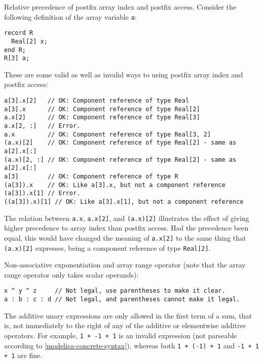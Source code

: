\begin{example}
Relative precedence of postfix array index and postfix access.
Consider the following definition of the array variable \lstinline!a!:
\begin{lstlisting}[language=modelica]
record R
  Real[2] x;
end R;
R[3] a;
\end{lstlisting}
These are some valid as well as invalid ways to using postfix array index and postfix access:
\begin{lstlisting}[language=modelica]
a[3].x[2]   // OK: Component reference of type Real
a[3].x      // OK: Component reference of type Real[2]
a.x[2]      // OK: Component reference of type Real[3]
a.x[2, :]   // Error.
a.x         // OK: Component reference of type Real[3, 2]
(a.x)[2]    // OK: Component reference of type Real[2] - same as a[2].x[:]
(a.x)[2, :] // OK: Component reference of type Real[2] - same as a[2].x[:]
a[3]        // OK: Component reference of type R
(a[3]).x    // OK: Like a[3].x, but not a component reference
(a[3]).x[1] // Error.
((a[3]).x)[1] // OK: Like a[3].x[1], but not a component reference
\end{lstlisting}
The relation between \lstinline!a.x!, \lstinline!a.x[2]!, and \lstinline!(a.x)[2]! illustrates the effect of giving higher precedence to array index than postfix access.
Had the precedence been equal, this would have changed the meaning of \lstinline!a.x[2]! to the same thing that \lstinline!(a.x)[2]! expresses, being a component reference of type \lstinline!Real[2]!.
\end{example}

\begin{example}
Non-associative exponentiation and array range operator (note that the array range operator only takes scalar operands):
\begin{lstlisting}[language=modelica]
x ^ y ^ z     // Not legal, use parentheses to make it clear.
a : b : c : d // Not legal, and parentheses cannot make it legal.
\end{lstlisting}
\end{example}

The additive unary expressions are only allowed in the first term of a sum, that is, not immediately to the right of any of the additive or elementwise additive operators.
For example, \lstinline!1 + -1 + 1! is an invalid expression (not parseable according to \cref{modelica-concrete-syntax}), whereas both \lstinline!1 + (-1) + 1! and \lstinline!-1 + 1 + 1! are fine.

